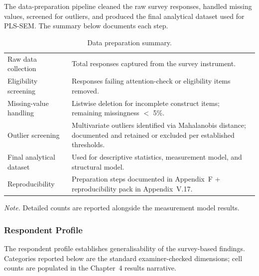 \noindent The data-preparation pipeline cleaned the raw survey responses, handled missing values, screened for outliers, and produced the final analytical dataset used for PLS-SEM. The summary below documents each step.

{\tablestripes\tablefontsize
{}
\begin{xltabular}{\textwidth}{@{} >{\raggedright\arraybackslash}p{5cm} L @{}}
\caption[Data preparation summary]{Data preparation summary.}\label{tab:ch4_data_preparation} \\
\toprule
{} &  \\
\midrule
\endfirsthead
\endhead
\bottomrule
\endlastfoot
Raw data collection & Total responses captured from the survey instrument. \\
\addlinespace
Eligibility screening & Responses failing attention-check or eligibility items removed. \\
\addlinespace
Missing-value handling & Listwise deletion for incomplete construct items; remaining missingness $<$ 5\%. \\
\addlinespace
Outlier screening & Multivariate outliers identified via Mahalanobis distance; documented and retained or excluded per established thresholds. \\
\addlinespace
Final analytical dataset & Used for descriptive statistics, measurement model, and structural model. \\
\addlinespace
Reproducibility & Preparation steps documented in Appendix~F + reproducibility pack in Appendix~V.17. \\
\end{xltabular}}

\vspace{0.3em}\noindent\textit{Note.} Detailed counts are reported alongside the measurement model results.


\subsubsection{Respondent Profile}
\label{sec:ch4_respondent_profile}

\noindent The respondent profile establishes generalisability of the survey-based findings. Categories reported below are the standard examiner-checked dimensions; cell counts are populated in the Chapter~4 results narrative.

